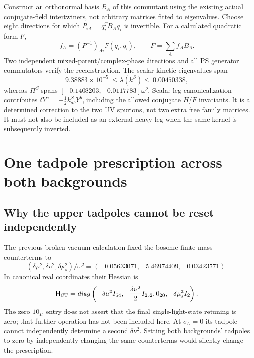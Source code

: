 \documentclass[11pt]{article}
\begin{document}
Construct an orthonormal basis $B_A$ of this commutant using the existing
actual conjugate-field intertwiners, not arbitrary matrices fitted to
eigenvalues. Choose eight directions for which
$P_{iA}=q_i^TB_Aq_i$ is invertible. For a calculated quadratic form $F$,
\begin{equation}
 f_A=(P^{-1})_{Ai}F(q_i,q_i),\qquad F=\sum_A f_AB_A.
\end{equation}
Two independent mixed-parent/complex-phase directions and all PS
generator commutators verify the reconstruction. The scalar kinetic
eigenvalues span
\begin{equation}
 9.38883\times10^{-5}\ \leq\lambda(k^S)\leq\ 0.00450338,
\end{equation}
whereas $\Pi^S$ spans $[-0.1408203,-0.0117783]\omega^2$.
Scalar-leg canonicalization contributes
$\delta Y^a=-\tfrac12 k^S_{ab}Y^b$, including the allowed conjugate $H/F$
invariants. It is a determined correction to the two UV spurions, not
two extra free family matrices. It must not also be included as an
external heavy leg when the same kernel is subsequently inverted.

\section{One tadpole prescription across both backgrounds}
\subsection{Why the upper tadpoles cannot be reset independently}
The previous broken-vacuum calculation fixed the bosonic finite mass
counterterms to
\begin{equation}
 (\delta\mu^2,\delta\nu^2,\delta\mu_s^2)/\omega^2
 =(-0.05633071,-5.46974409,-0.03423771).
\end{equation}
In canonical real coordinates their Hessian is
\begin{equation}
 \mathsf H_{\rm CT}=diag\left(
 -\delta\mu^2 I_{54},-\frac{\delta\nu^2}{2}I_{252},
 0_{20},-\delta\mu_s^2 I_2\right).
 \label{eq:ct}
\end{equation}
The zero $10_H$ entry does not assert that the final single-light-state
retuning is zero; that further operation has not been included here.
At $\sigma_U=0$ its tadpole cannot independently determine a second
$\delta\nu^2$. Setting both backgrounds' tadpoles to zero by independently
changing the same counterterms would silently change the prescription.
\end{document}
